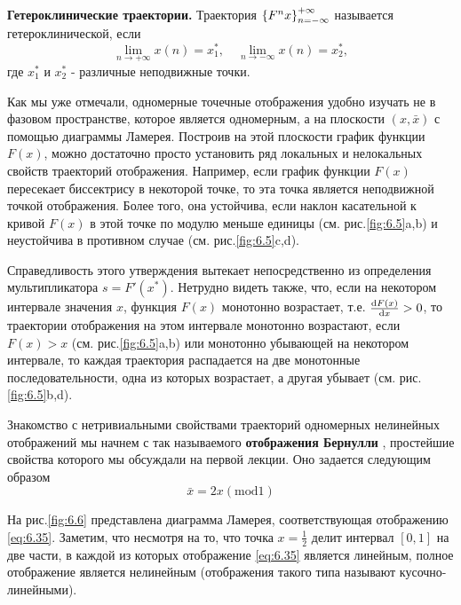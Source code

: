 \textbf{Гетероклинические траектории.} Траектория $\qty{ F^n x}^{+ \infty}_{n = - \infty}$ называется гетероклинической, если
\begin{equation}
        \label{eq:}
        \lim_{n \to +\infty} x(n) = x_1^*, \quad \lim_{n \to -\infty} x(n) = x_2^*,
\end{equation}
где $x_1^*$ и $x_2^*$ - различные неподвижные точки.

Как мы уже отмечали, одномерные точечные отображения удобно изучать не в фазовом пространстве, которое является одномерным,
а на плоскости $(x, \bar x)$ с помощью диаграммы Ламерея. Построив на этой плоскости график функции $F(x)$, можно достаточно просто установить ряд локальных и нелокальных
свойств траекторий отображения. Например, если график функции $F(x)$ пересекает биссектрису в некоторой точке, то эта точка является неподвижной точкой отображения. Более того, она устойчива, если
наклон касательной к кривой $F(x)$ в этой точке по модулю меньше единицы
(см. рис.\ref{fig:6.5}a,b) и неустойчива в противном случае (см. рис.\ref{fig:6.5}c,d).

Справедливость этого утверждения вытекает непосредственно из определения мультипликатора $s= F'(x^*)$. Нетрудно видеть также, что, если на некотором интервале значения $x$,
функция $F(x)$ монотонно возрастает, т.е. $\dv{F(x)}{x}>0$, то траектории отображения на этом интервале монотонно возрастают, если  $F(x)>x$ (см. рис.\ref{fig:6.5}a,b) или монотонно убывающей на
некотором интервале, то каждая траектория распадается на две монотонные последовательности, одна из которых возрастает, а 
другая убывает (см. рис.\ref{fig:6.5}b,d).

Знакомство с нетривиальными свойствами траекторий одномерных
нелинейных отображений мы начнем с так называемого \textbf{отображения
Бернулли} , простейшие свойства которого мы обсуждали на первой лекции. Оно
задается следующим образом
\begin{equation}
        \label{eq:6.35}
        \bar x = 2x(\mathrm{mod} 1)
\end{equation}

На рис.\ref{fig:6.6} представлена диаграмма Ламерея, соответствующая отображению \eqref{eq:6.35}. 
Заметим, что несмотря на то, что точка $x = \frac{1}{2}$ делит интервал $[0,1]$ на две части, в каждой из которых отображение \eqref{eq:6.35} является линейным, полное отображение является нелинейным (отображения такого типа называют кусочно-линейными).

